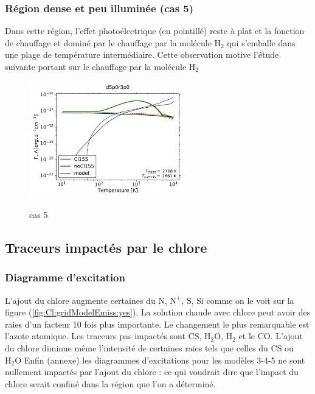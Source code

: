 \subsubsection{Région dense et peu illuminée (cas 5)}

Dans cette région, l'effet photoélectrique (en pointillé) reste à plat et la fonction de chauffage et dominé par le chauffage par la molécule $\mathrm{H}_2$ qui s'emballe dans une plage de température intermédiaire. Cette observation motive l'étude suivante portant sur le chauffage par la molécule $\mathrm{H}_2$ 

\begin{figure}[!htbp]
    \centering
    \includegraphics[trim = {0 0 0 0},clip,width=0.6\textwidth]{figure/Cl/particuliers/chofra3_d5p0r3p0_d5p0r3p0.pdf}
        \caption{cas 5}
    \caption{}
    \label{fig:Cl:particuliers:chofra5}
\end{figure}

\subsection{Traceurs impactés par le chlore}
\subsubsection{Diagramme d'excitation}

L'ajout du chlore augmente certaines du $\mathrm{N}$, $\mathrm{N}^+$, $\mathrm{S}$, $\mathrm{Si}$ comme on le voit sur la figure (\autoref{fig:Cl:gridModelEmiss:yes}). La solution chaude avec chlore peut avoir des raies d'un facteur 10 fois plus importante. Le changement le plus remarquable est l'azote atomique. Les traceurs pas impactés sont $\mathrm{CS}$, $\mathrm{H}_2\mathrm{O}$, $\mathrm{H}_2$ et le $\mathrm{CO}$. L'ajout du chlore diminue même l'intensité de certaines raies tels que celles du $\mathrm{CS}$ ou $\mathrm{H}_2\mathrm{O}$ Enfin (annexe) les diagrammes d'excitations pour les modèles 3-4-5 ne sont nullement impactés par l'ajout du chlore : ce qui voudrait dire que l'impact du chlore serait confiné dans la région que l'on a déterminé.

